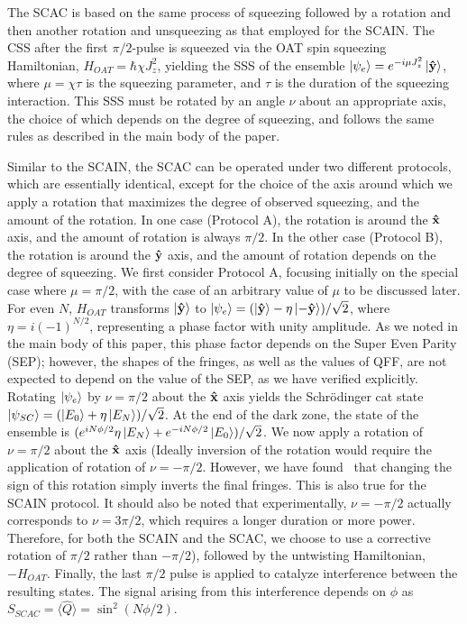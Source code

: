 \documentclass[aps,pra,letterpaper,superscriptaddress,showpacs,amsmath,floats,twocolumn]{revtex4-1}
\begin{document}
The SCAC is based on the same process of squeezing followed by a rotation and then another rotation and unsqueezing as that employed for the SCAIN. The CSS after the first $\pi/2$-pulse is squeezed via the OAT spin squeezing Hamiltonian, $H_{OAT} = \hbar \chi J_z^2$, yielding the SSS of the ensemble $\ket{\psi_e}=e^{-i \mu J_z^2}\ket{\vu{y}}$, where $\mu=\chi\tau$ is the squeezing parameter, and $\tau$ is the duration of the squeezing interaction. This SSS must be rotated by an angle $\nu$ about an appropriate axis, the choice of which depends on the degree of squeezing, and follows the same rules as described in the main body of the paper.

Similar to the SCAIN, the SCAC can be operated under two different protocols, which are essentially identical, except for the choice of the axis around which we apply a rotation that maximizes the degree of observed squeezing, and the amount of the rotation. In one case (Protocol A), the rotation is around the $\vu{x}$ axis, and the amount of rotation is always $\pi/2$. In the other case (Protocol B), the rotation is around the $\vu{y}$ axis, and the amount of rotation depends on the degree of squeezing. We first consider Protocol A, focusing initially on the special case where $\mu=\pi/2$, with the case of an arbitrary value of $\mu$ to be discussed later. For even $N$, $H_{OAT}$ transforms $\ket{\vu{y}}$ to $\ket{\psi_e} = (\ket{\vu{y}} - \eta \ket{-\vu{y}})/\sqrt{2}$, where $\eta=i(-1)^{N/2}$, representing a phase factor with unity amplitude. As we noted in the main body of this paper, this phase factor depends on the Super Even Parity (SEP); however, the shapes of the fringes, as well as the values of QFF, are not expected to depend on the value of the SEP, as we have verified explicitly. Rotating $\ket{\psi_e}$ by $\nu=\pi/2$ about the $\vu{x}$ axis yields the Schr\"odinger cat state $\ket{\psi_{SC}}=(\ket{E_0} + \eta \ket{E_N})/\sqrt{2}$. At the end of the dark zone, the state of the ensemble is $ (e^{iN\phi/2}\eta \ket{E_N} + e^{-iN\phi/2}\ket{E_0})/\sqrt{2}$. We now apply a rotation of $\nu=\pi/2$ about the $\vu{x}$ axis (Ideally inversion of the rotation would require the application of rotation of $\nu=-\pi/2$. However, we have found~\cite{Shahriar2} that changing the sign of this rotation simply inverts the final fringes. This is also true for the SCAIN protocol. It should also be noted that experimentally, $\nu=-\pi/2$ actually corresponds to $\nu=3\pi/2$, which requires a longer duration or more power. Therefore, for both the SCAIN and the SCAC, we choose to use a corrective rotation of $\pi/2$ rather than $-\pi/2$), followed by the untwisting Hamiltonian, $-H_{OAT}$. Finally, the last $\pi/2$ pulse is applied to catalyze interference between the resulting states. The signal arising from this interference depends on $\phi$ as $S_{SCAC} =\langle\hat{Q}\rangle= \sin^2(N\phi/2)$.
\end{document}
